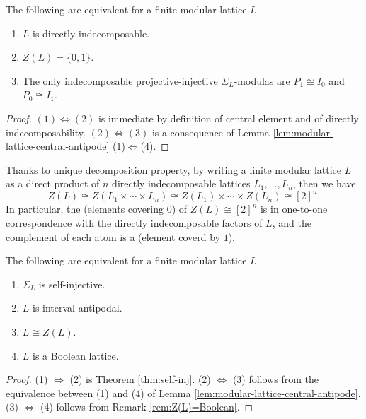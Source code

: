 \documentclass[a4paper,leqno]{amsart}
\begin{document}
\begin{cor}\label{cor:directly indecomposable lattice}
The following are equivalent for a finite modular lattice $L$.
\begin{enumerate}
    \item $L$ is directly indecomposable.
    \item $Z(L)=\{0,1\}$.
    \item The only indecomposable projective-injective $\Sigma_L$-modulas are $P_1\cong I_0$ and $P_0\cong I_1$.
\end{enumerate}
\end{cor}
\begin{proof}
$(1)\Leftrightarrow(2)$ is immediate by definition of central element and of directly indecomposability.  $(2)\Leftrightarrow(3)$ is a consequence of Lemma \ref{lem:modular-lattice-central-antipode} (1)$\Leftrightarrow$(4).
\end{proof}
\begin{rmk}\label{rem:Z(L)=Boolean}
Thanks to unique decomposition property, by writing a finite modular lattice $L$ as a direct product of $n$ directly indecomposable lattices $L_1,\ldots, L_n$, then we have $$Z(L) \cong Z(L_1\times \cdots  \times  L_n) \cong Z(L_1)\times \cdots \times Z(L_n) \cong [2]^n.$$  
In particular, the  (elements covering $0$) of $Z(L)\cong [2]^n$ is in one-to-one correspondence with the directly indecomposable factors of $L$, and the complement of each atom is a  (element coverd by $1$).    
\end{rmk}


\begin{cor}\label{cor:modular-lattice-interval-antipodal}
The following are equivalent for a finite modular lattice $L$.
\begin{enumerate}
    \item $\Sigma_L$ is self-injective.
    \item $L$ is interval-antipodal.
    \item $L\cong Z(L)$.
    \item $L$ is a Boolean lattice.
\end{enumerate}
\end{cor}

\begin{proof}
(1) $\Leftrightarrow$ (2) is Theorem \ref{thm:self-inj}. 
(2) $\Leftrightarrow$ (3) follows from the equivalence between (1) and (4) of Lemma \ref{lem:modular-lattice-central-antipode}.  (3) $\Leftrightarrow$ (4) follows from Remark \ref{rem:Z(L)=Boolean}.
\end{proof}
\end{document}

